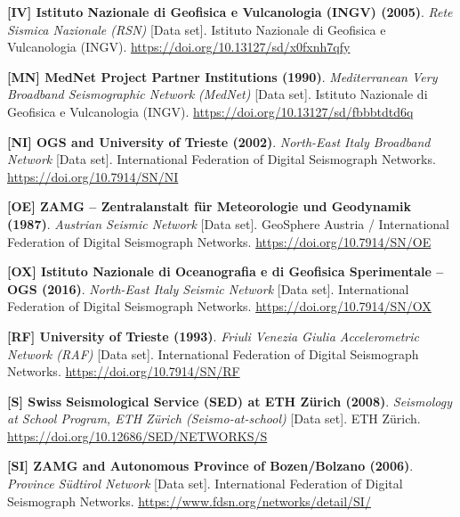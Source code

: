 \begin{enumerate}[label={[\textbf{\arabic*}]},leftmargin=*]
  \item \textbf{[IV] Istituto Nazionale di Geofisica e Vulcanologia
    (INGV) (2005)}.
    \textit{Rete Sismica Nazionale (RSN)} [Data set].
    Istituto Nazionale di Geofisica e Vulcanologia (INGV).
    \url{https://doi.org/10.13127/sd/x0fxnh7qfy}

  \item \textbf{[MN] MedNet Project Partner Institutions (1990)}.
    \textit{Mediterranean Very Broadband Seismographic Network
    (MedNet)} [Data set].
    Istituto Nazionale di Geofisica e Vulcanologia (INGV).
    \url{https://doi.org/10.13127/sd/fbbbtdtd6q}

  \item \textbf{[NI] \ac{OGS} and University of Trieste (2002)}.
    \textit{North-East Italy Broadband Network} [Data set].
    International Federation of Digital Seismograph Networks.
    \url{https://doi.org/10.7914/SN/NI}

  \item \textbf{[OE] ZAMG -- Zentralanstalt f\"ur Meteorologie und
    Geodynamik (1987)}.
    \textit{Austrian Seismic Network} [Data set].
    GeoSphere Austria / International Federation of Digital
    Seismograph Networks.
    \url{https://doi.org/10.7914/SN/OE}

  \item \textbf{[OX] Istituto Nazionale di Oceanografia e di
    Geofisica Sperimentale -- \ac{OGS} (2016)}.
    \textit{North-East Italy Seismic Network} [Data set].
    International Federation of Digital Seismograph Networks.
    \url{https://doi.org/10.7914/SN/OX}

  \item \textbf{[RF] University of Trieste (1993)}.
    \textit{Friuli Venezia Giulia Accelerometric Network (RAF)} [Data set].
    International Federation of Digital Seismograph Networks.
    \url{https://doi.org/10.7914/SN/RF}

  \item \textbf{[S] Swiss Seismological Service (SED) at ETH Z\"urich (2008)}.
    \textit{Seismology at School Program, ETH Z\"urich
    (Seismo-at-school)} [Data set].
    ETH Z\"urich.
    \url{https://doi.org/10.12686/SED/NETWORKS/S}

  \item \textbf{[SI] ZAMG and Autonomous Province of Bozen/Bolzano (2006)}.
    \textit{Province S\"udtirol Network} [Data set].
    International Federation of Digital Seismograph Networks.
    \url{https://www.fdsn.org/networks/detail/SI/}


\end{enumerate}
